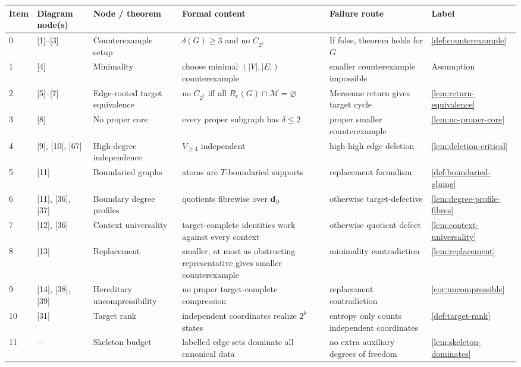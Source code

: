 \documentclass[11pt]{article}
\newcommand{\Mers}{\mathcal M}
\begin{document}
{\scriptsize\setlength{\tabcolsep}{2pt}
\begin{longtable}{C{0.04\textwidth} L{0.13\textwidth} L{0.17\textwidth} L{0.25\textwidth} L{0.21\textwidth} L{0.12\textwidth}}
\toprule
\textbf{Item} & \textbf{Diagram node(s)} & \textbf{Node / theorem} & \textbf{Formal content} & \textbf{Failure route} & \textbf{Label} \\
 & [1]--[3] & Counterexample setup & $\delta(G)\ge3$ and no $C_{2^j}$ & If false, theorem holds for $G$ & \cref{def:counterexample} \\
1 & [4] & Minimality & choose minimal $(|V|,|E|)$ counterexample & smaller counterexample impossible & Assumption \\
2 & [5]--[7] & Edge-rooted target equivalence & no $C_{2^j}$ iff all $R_e(G)\cap\Mers=\varnothing$ & Mersenne return gives target cycle & \cref{lem:return-equivalence} \\
3 & [8] & No proper core & every proper subgraph has $\delta\le2$ & proper smaller counterexample & \cref{lem:no-proper-core} \\
4 & [9], [10], [67] & High-degree independence & $V_{\ge4}$ independent & high-high edge deletion & \cref{lem:deletion-critical} \\
5 & [11] & Boundaried graphs & atoms are $T$-boundaried supports & replacement formalism & \cref{def:boundaried-gluing} \\
6 & [11], [36], [37] & Boundary degree profiles & quotients fibrewise over $\mathbf d_\partial$ & otherwise target-defective & \cref{lem:degree-profile-fibres} \\
7 & [12], [36] & Context universality & target-complete identities work against every context & otherwise quotient defect & \cref{lem:context-universality} \\
8 & [13] & Replacement & smaller, at most as obstructing representative gives smaller counterexample & minimality contradiction & \cref{lem:replacement} \\
9 & [14], [38], [39] & Hereditary uncompressibility & no proper target-complete compression & replacement contradiction & \cref{cor:uncompressible} \\
10 & [31] & Target rank & independent coordinates realize $2^k$ states & entropy only counts independent coordinates & \cref{def:target-rank} \\
11 & --- & Skeleton budget & labelled edge sets dominate all canonical data & no extra auxiliary degrees of freedom & \cref{lem:skeleton-dominates} \\

\end{longtable}}
\end{document}
